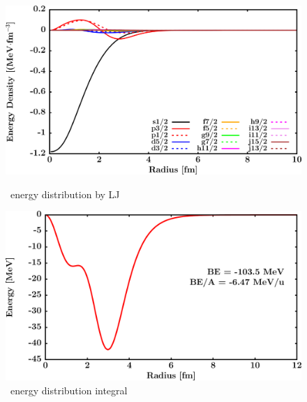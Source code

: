 \begin{figure}[hbtp]
    \centering
    \begin{minipage}{0.45\textwidth}
        \centering
        \includegraphics[width=\textwidth]{figures/o16_EnergyDist.png}
        \caption*{\oSix\ energy distribution by LJ}
        \label{DOMFitData_o16_proton_energyDistInt}
    \end{minipage}\hspace{6pt}
    \begin{minipage}{0.45\textwidth}
        \centering
        \includegraphics[width=\textwidth]{figures/o16_EnergyDistIntegral.png}
        \caption*{\oSix\ energy distribution integral}
        \label{DOMFitData_o16_neutron_energyDistInt}
    \end{minipage}
\end{figure}
\vspace{0.4in}
